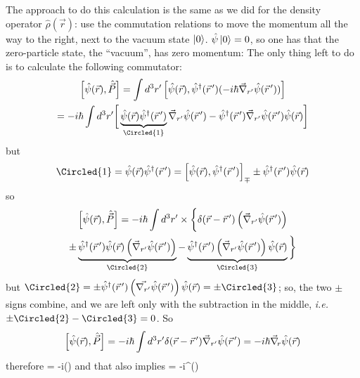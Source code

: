 \documentclass[12pt]{article}
\begin{document}
The approach to do this calculation is the same as we did for the density operator $\hat{\rho}(\vec{r})$:
use the commutation relations to move the momentum all the way to the right, next to the vacuum state $\ket{0}$.
$\hat{\psi}\ket{0} = 0$, so one has that the zero-particle
state, the ``vacuum'', has zero momentum:
\be
{}
\ee
The only thing left to do is to calculate the following commutator:
\[
\begin{gathered}
\left[\hat{\psi}(\vec{r}),\hat{\vec{P}}\right] = 
\int d^3r^\prime
\left[
\hat{\psi}(\vec{r}),\hat{\psi}^\dagger(\vecrp)(-i\hbar\vec{\nabla}_{r^\prime}\hat{\psi}(\vecrp))
\right]\\
=-i\hbar \int d^3r^\prime
\bigg[
\underbrace{\hat{\psi}(\vec{r}) \hat{\psi}^\dagger(\vecrp)}_{\Circled{1}} \vec{\nabla}_{r^\prime} \hat{\psi}(\vecrp) -
\hat{\psi}^\dagger (\vecrp)\vec{\nabla}_{r^\prime} \hat{\psi}(\vecrp) \hat{\psi}(\vec{r}) 
\bigg]
\end{gathered}
\]
but 
\[
\Circled{1}=\hat{\psi}(\vec{r}) \hat{\psi}^\dagger(\vecrp) =
\left[
\hat{\psi}(\vec{r}), \hat{\psi}^\dagger(\vecrp)
\right]_\mp \pm  \hat{\psi}^\dagger(\vecrp)\hat{\psi}(\vec{r})
\]
so
\[
\begin{gathered}
\left[\hat{\psi}(\vec{r}),\hat{\vec{P}}\right] = -i\hbar \int d^3r^\prime \times
\bigg\{
    \delta(\vec{r}-\vecrp) \left(\vec{\nabla}_{r^\prime}\hat{\psi}(\vecrp)\right)\\ 
	\pm \underbrace{\hat{\psi}^{\dagger}(\vecrp) \hat{\psi}(\vec{r}) \left(\vec{\nabla}_{r^\prime}\hat{\psi}(\vecrp)\right)}%
	_{\Circled{2}}
	- \underbrace{\hat{\psi}^{\dagger}(\vecrp) \left(\vec{\nabla}_{r^\prime}\hat{\psi}(\vecrp)\right) \hat{\psi}(\vec{r})}%
	_{\Circled{3}}
\bigg\}\\
\end{gathered}
\]
but $\Circled{2} = \pm \hat{\psi}^{\dagger}(\vecrp) \left(\vec{\nabla_{r^\prime}}\hat{\psi}(\vecrp)\right) \hat{\psi}(\vec{r}) = \pm\Circled{3}$; so, the two $\pm$ signs combine, and we are left only with the subtraction in the middle,
\textit{i.e.} $\pm \Circled{2} - \Circled{3} = 0$. So
\[
\begin{gathered}
\left[\hat{\psi}(\vec{r}),\hat{\vec{P}}\right]
= -i\hbar \int d^3r^\prime \delta(\vec{r}-\vec{r}^{\,\prime}) \vec{\nabla}_{r^\prime} \hat{\psi}(\vec{r}^{\,\prime}) = 
-i\hbar \vec{\nabla}_{\!r} \hat{\psi}(\vec{r})
\end{gathered}
\]
therefore %
\be
{} = -i\hbar \vecnr \hat{\psi}()
\ee
and that also implies
\be
{} = -i\hbar \vecnr \hat{\psi}^\dagger()
\ee
\end{document}
